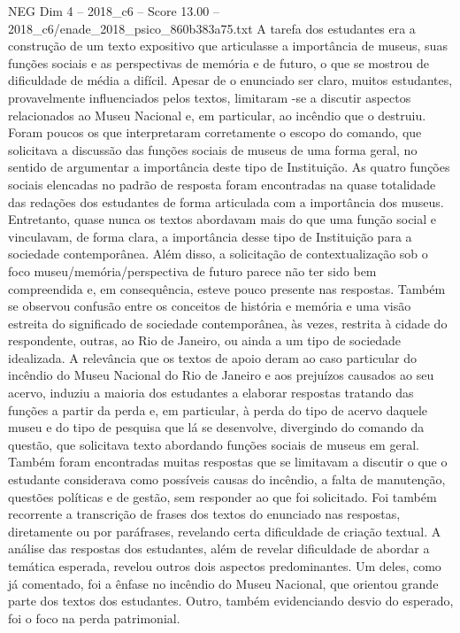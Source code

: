 \begin{textsample}{NEG Dim 4 – 2018\_c6 – Score 13.00 – 2018\_c6/enade\_2018\_psico\_860b383a75.txt}
A tarefa dos estudantes era a construção de um texto expositivo que articulasse a importância de museus, suas funções sociais e as perspectivas de memória e de futuro, o que se mostrou de dificuldade de média a difícil.
Apesar de o enunciado ser claro, muitos estudantes, provavelmente influenciados pelos textos, limitaram -se a discutir aspectos relacionados ao Museu Nacional e, em particular, ao incêndio que o destruiu.
Foram poucos os que interpretaram corretamente o escopo do comando, que solicitava a discussão das funções sociais de museus de uma forma geral, no sentido de argumentar a importância deste tipo de Instituição.
As quatro funções sociais elencadas no padrão de resposta foram encontradas na quase totalidade das redações dos estudantes de forma articulada com a importância dos museus.
Entretanto, quase nunca os textos abordavam mais do que uma função social e vinculavam, de forma clara, a importância desse tipo de Instituição para a sociedade contemporânea.
Além disso, a solicitação de contextualização sob o foco museu/memória/perspectiva de futuro parece não ter sido bem compreendida e, em consequência, esteve pouco presente nas respostas.
Também se observou confusão entre os conceitos de história e memória e uma visão estreita do significado de sociedade contemporânea, às vezes, restrita à cidade do respondente, outras, ao Rio de Janeiro, ou ainda a um tipo de sociedade idealizada.
A relevância que os textos de apoio deram ao caso particular do incêndio do Museu Nacional do Rio de Janeiro e aos prejuízos causados ao seu acervo, induziu a maioria dos estudantes a elaborar respostas tratando das funções a partir da perda e, em particular, à perda do tipo de acervo daquele museu e do tipo de pesquisa que lá se desenvolve, divergindo do comando da questão, que solicitava texto abordando funções sociais de museus em geral.
Também foram encontradas muitas respostas que se limitavam a discutir o que o estudante considerava como possíveis causas do incêndio, a falta de manutenção, questões políticas e de gestão, sem responder ao que foi solicitado.
Foi também recorrente a transcrição de frases dos textos do enunciado nas respostas, diretamente ou por paráfrases, revelando certa dificuldade de criação textual.
A análise das respostas dos estudantes, além de revelar dificuldade de abordar a temática esperada, revelou outros dois aspectos predominantes.
Um deles, como já comentado, foi a ênfase no incêndio do Museu Nacional, que orientou grande parte dos textos dos estudantes.
Outro, também evidenciando desvio do esperado, foi o foco na perda patrimonial.

\end{textsample}
